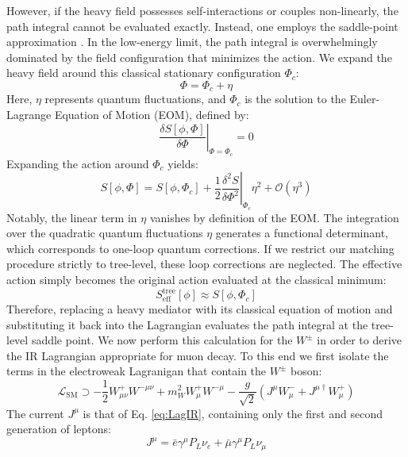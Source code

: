 However, if the heavy field possesses self-interactions or couples non-linearly, the path integral cannot be evaluated exactly. Instead, one employs the saddle-point approximation \cite{henning2015usestandardmodeleffective}. In the low-energy limit, the path integral is overwhelmingly dominated by the field configuration that minimizes the action. We expand the heavy field around this classical stationary configuration $\Phi_c$:
\begin{equation}
    \Phi = \Phi_c + \eta
\end{equation}
Here, $\eta$ represents quantum fluctuations, and $\Phi_c$ is the solution to the Euler-Lagrange Equation of Motion (EOM), defined by:
\begin{equation}
    \left. \frac{\delta S[\phi, \Phi]}{\delta \Phi} \right|_{\Phi = \Phi_c} = 0
\end{equation}
Expanding the action around $\Phi_c$ yields:
\begin{equation}
    S[\phi, \Phi] = S[\phi, \Phi_c] + \frac{1}{2} \left. \frac{\delta^2 S}{\delta \Phi^2} \right|_{\Phi_c} \eta^2 + \mathcal{O}(\eta^3)
\end{equation}
Notably, the linear term in $\eta$ vanishes by definition of the EOM. The integration over the quadratic quantum fluctuations $\eta$ generates a functional determinant, which corresponds to one-loop quantum corrections.
If we restrict our matching procedure strictly to tree-level, these loop corrections are neglected. The effective action simply becomes the original action evaluated at the classical minimum:
\begin{equation}
    S_{\text{eff}}^{\text{tree}}[\phi] \approx S[\phi, \Phi_c]
\end{equation}
Therefore, replacing a heavy mediator with its classical equation of motion and substituting it back into the Lagrangian evaluates the path integral at the tree-level saddle point. We now perform this calculation for the $W^\pm$ in order to derive the IR Lagrangian appropriate for muon decay. To this end we first isolate the terms in the electroweak Lagranigan that contain the $W^\pm$ boson:
\begin{equation}
    \mathcal{L}_ \text{SM} \supset -\frac{1}{2} W_{\mu\nu}^+ W^{-\mu\nu} + m_W^2 W_\mu^+ W^{-\mu} - \frac{g}{\sqrt{2}} \left( J^\mu W_\mu^- + J^{\mu \dagger} W_\mu^+ \right)
    \label{eq:LagW}
\end{equation}
The current $J^\mu$ is that of Eq. \ref{eq:LagIR}, containing only the first and second generation of leptons:
\begin{equation}
    J^\mu=\bar{e} \gamma^\mu P_L \nu_e + \bar{\mu} \gamma^\mu P_L \nu_\mu 
\end{equation}
